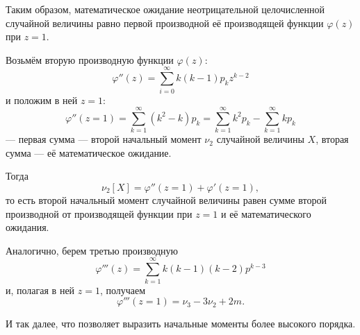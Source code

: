\documentclass[a4paper]{article}
\begin{document}
                Таким образом, математическое ожидание неотрицательной целочисленной случайной величины равно первой производной её производящей функции $\varphi (z)$ при $z = 1$.

                Возьмём вторую производную функции $\varphi (z)$:
                \begin{equation*}
                    \varphi '' (z) = \sum\limits_{i = 0}^{\infty} k (k - 1) p_k z^{k - 2}
                \end{equation*}
                и положим в ней $z = 1$:
                \begin{equation*}
                    \varphi '' (z = 1) = \sum\limits_{k = 1}^{\infty} (k^2 - k) p_k =
                        \sum\limits_{k = 1}^{\infty} k^2 p_k -
                        \sum\limits_{k = 1}^{\infty} k p_k
                \end{equation*}
                --- первая сумма --- второй начальный момент $\nu_2$ случайной величины $X$, вторая сумма --- её математическое ожидание.

                Тогда
                \begin{equation*}
                    \nu_2 [X] = \varphi '' (z = 1) + \varphi ' (z = 1) ,
                \end{equation*}
                то есть второй начальный момент случайной величины равен сумме второй производной от производящей функции при $z = 1$ и её математического ожидания.

                Аналогично, берем третью производную
                \begin{equation*}
                    \varphi ''' (z) =
                        \sum\limits_{k = 1}^{\infty} k (k - 1) (k - 2) p^{k - 3}
                \end{equation*}
                и, полагая в ней $z = 1$, получаем
                \begin{equation*}
                    \varphi ''' (z = 1) = \nu_3 - 3 \nu_2 + 2 m .
                \end{equation*}
                
                И так далее, что позволяет выразить начальные моменты более высокого порядка.
\end{document}
